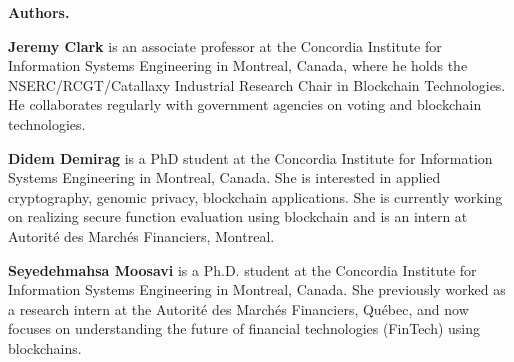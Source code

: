 \documentclass[acmlarge,screen]{acmart}
\begin{document}
\begin{Sidebar*}[h!]
\begin{framed}
\begin{flushleft}
\textbf{Authors.} \newline

\textbf{Jeremy Clark} is an associate professor at the Concordia Institute for Information Systems Engineering in Montreal, Canada, where he holds the NSERC/RCGT/Catallaxy Industrial Research Chair in Blockchain Technologies. He collaborates regularly with government agencies on voting and blockchain technologies. \newline

\textbf{Didem Demirag} is a PhD student at the Concordia Institute for Information Systems Engineering in Montreal, Canada. She is interested in applied cryptography, genomic privacy, blockchain applications. She is currently working on realizing secure function evaluation using blockchain and is an intern at Autorit\'e des March\'es Financiers, Montreal.
 \newline

\textbf{Seyedehmahsa Moosavi} is a Ph.D. student at the Concordia Institute for Information Systems Engineering in Montreal, Canada. She previously worked as a research intern at the Autorité des Marchés Financiers, Québec, and now focuses on understanding the future of financial technologies (FinTech) using blockchains. \newline

\end{flushleft}
\end{framed}
\end{Sidebar*}



\end{document}
